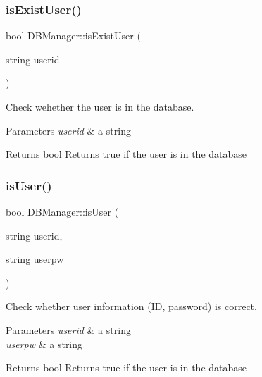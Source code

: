 \subsubsection{\texorpdfstring{is\+Exist\+User()}{isExistUser()}}
{\footnotesize\ttfamily bool D\+B\+Manager\+::is\+Exist\+User (\begin{DoxyParamCaption}\item[{string}]{userid }\end{DoxyParamCaption})}



Check wehether the user is in the database. 


\begin{DoxyParams}{Parameters}
{\em userid} & a string \\
\hline
\end{DoxyParams}
\begin{DoxyReturn}{Returns}
bool Returns true if the user is in the database 
\end{DoxyReturn}
\mbox{\label{class_d_b_manager_a3fb201b447281395526cc71e8c408051}} 
\subsubsection{\texorpdfstring{is\+User()}{isUser()}}
{\footnotesize\ttfamily bool D\+B\+Manager\+::is\+User (\begin{DoxyParamCaption}\item[{string}]{userid,  }\item[{string}]{userpw }\end{DoxyParamCaption})}



Check whether user information (ID, password) is correct. 


\begin{DoxyParams}{Parameters}
{\em userid} & a string \\
\hline
{\em userpw} & a string \\
\hline
\end{DoxyParams}
\begin{DoxyReturn}{Returns}
bool Returns true if the user is in the database 
\end{DoxyReturn}
\mbox{\label{class_d_b_manager_a0af0724f0b21b7e33062b93bd700ded6}} 
